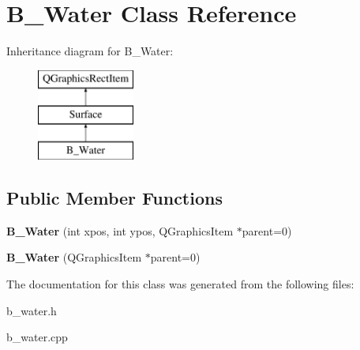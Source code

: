 \hypertarget{class_b___water}{}\section{B\+\_\+\+Water Class Reference}
\label{class_b___water}
Inheritance diagram for B\+\_\+\+Water\+:\begin{figure}[H]
\begin{center}
\leavevmode
\includegraphics[height=3.000000cm]{class_b___water}
\end{center}
\end{figure}
\subsection*{Public Member Functions}
\begin{DoxyCompactItemize}
\item 
\hypertarget{class_b___water_a6c1ef8207043a950c74583332e00bb7f}{}{\bfseries B\+\_\+\+Water} (int xpos, int ypos, Q\+Graphics\+Item $\ast$parent=0)\label{class_b___water_a6c1ef8207043a950c74583332e00bb7f}

\item 
\hypertarget{class_b___water_a7286659987b70322806f866c1faaf218}{}{\bfseries B\+\_\+\+Water} (Q\+Graphics\+Item $\ast$parent=0)\label{class_b___water_a7286659987b70322806f866c1faaf218}

\end{DoxyCompactItemize}


The documentation for this class was generated from the following files\+:\begin{DoxyCompactItemize}
\item 
b\+\_\+water.\+h\item 
b\+\_\+water.\+cpp\end{DoxyCompactItemize}
